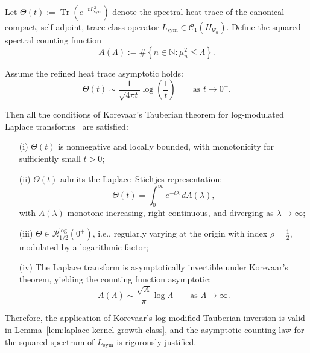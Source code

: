 \begin{lemma}
\label{lem:korevaar-tauberian-constants-verified}
Let \( \Theta(t) := \operatorname{Tr}(e^{-t L_{\mathrm{sym}}^2}) \) denote the spectral heat trace of the canonical compact, self-adjoint, trace-class operator \( L_{\mathrm{sym}} \in \mathcal{C}_1(H_{\Psi_\alpha}) \). Define the squared spectral counting function
\[
A(\Lambda) := \#\left\{ n \in \mathbb{N} : \mu_n^2 \le \Lambda \right\}.
\]

Assume the refined heat trace asymptotic holds:
\[
\Theta(t) \sim \frac{1}{\sqrt{4\pi t}} \log\left( \frac{1}{t} \right) \qquad \text{as } t \to 0^+.
\]

Then all the conditions of Korevaar’s Tauberian theorem for log-modulated Laplace transforms~\cite[Ch.~III, Thm.~5.5]{Korevaar2004Tauberian} are satisfied:
\begin{enumerate}
  \item[\textnormal{(i)}] \( \Theta(t) \) is nonnegative and locally bounded, with monotonicity for sufficiently small \( t > 0 \);
  
  \item[\textnormal{(ii)}] \( \Theta(t) \) admits the Laplace–Stieltjes representation:
  \[
  \Theta(t) = \int_0^\infty e^{-t \lambda} \, dA(\lambda),
  \]
  with \( A(\lambda) \) monotone increasing, right-continuous, and diverging as \( \lambda \to \infty \);
  
  \item[\textnormal{(iii)}] \( \Theta \in \mathcal{R}_{1/2}^{\log}(0^+) \), i.e., regularly varying at the origin with index \( \rho = \tfrac{1}{2} \), modulated by a logarithmic factor;
  
  \item[\textnormal{(iv)}] The Laplace transform is asymptotically invertible under Korevaar’s theorem, yielding the counting function asymptotic:
  \[
  A(\Lambda) \sim \frac{\sqrt{\Lambda}}{\pi} \log \Lambda \qquad \text{as } \Lambda \to \infty.
  \]
\end{enumerate}

\noindent
Therefore, the application of Korevaar’s log-modified Tauberian inversion is valid in Lemma~\ref{lem:laplace-kernel-growth-class}, and the asymptotic counting law for the squared spectrum of \( L_{\mathrm{sym}} \) is rigorously justified.
\end{lemma}
